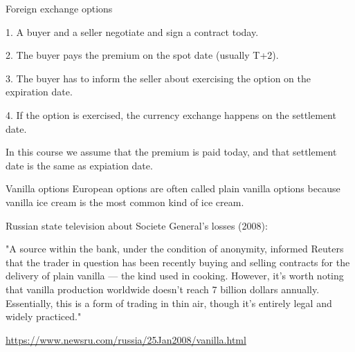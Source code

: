 \documentclass{beamer}
\begin{document}
\begin{frame}{Foreign exchange options}
\justify
\centering
{}
	
\justify

1. A buyer and a seller negotiate and sign a contract \alert{today}.

2. The buyer pays the premium on the \alert{spot date} (usually T+2).

3. The buyer has to inform the seller about exercising the option on the \alert{expiration date}.

4. If the option is exercised, the currency exchange happens on the \alert{settlement date}.

\justify
In this course we assume that the premium is paid today, and that settlement date is the same as expiation date.
\end{frame}



\begin{frame}{Vanilla options}
\justify
European options are often called \alert{plain vanilla} options because vanilla ice cream is the most common kind of ice cream.

\justify
Russian state television about Societe General's losses (2008):

\justify
"A source within the bank, under the condition of anonymity, informed Reuters that the trader in question has been recently buying and selling contracts for the delivery of \alert{plain vanilla --- the kind used in cooking}. However, it's worth noting that vanilla production worldwide doesn't reach 7 billion dollars annually. Essentially, this is a form of trading in thin air, though it's entirely legal and widely practiced."

\justify
\url{https://www.newsru.com/russia/25Jan2008/vanilla.html}
\end{frame}
\end{document}
